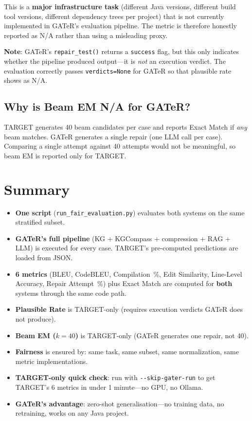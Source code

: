 \documentclass[11pt,a4paper]{article}
\begin{document}
This is a \textbf{major infrastructure task} (different Java versions,
different build tool versions, different dependency trees per project)
that is not currently implemented in GATeR's evaluation pipeline.
The metric is therefore honestly reported as N/A rather than using
a misleading proxy.

\textbf{Note}: GATeR's \texttt{repair\_test()} returns a
\texttt{success} flag, but this only indicates whether the pipeline
produced output---it is \emph{not} an execution verdict.
The evaluation correctly passes \texttt{verdicts=None} for GATeR so
that plausible rate shows as N/A.

\subsection{Why is Beam EM N/A for GATeR?}

TARGET generates 40 beam candidates per case and reports Exact Match
if \emph{any} beam matches. GATeR generates a single repair (one LLM
call per case). Comparing a single attempt against 40 attempts would
not be meaningful, so beam EM is reported only for TARGET.

\section{Summary}

\begin{itemize}
    \item \textbf{One script} (\texttt{run\_fair\_evaluation.py}) evaluates
          both systems on the same stratified subset.
    \item \textbf{GATeR's full pipeline} (KG + KGCompass + compression +
          RAG + LLM) is executed for every case.
          TARGET's pre-computed predictions are loaded from JSON.
    \item \textbf{6 metrics} (BLEU, CodeBLEU, Compilation~\%, Edit
          Similarity, Line-Level Accuracy, Repair Attempt~\%) plus
          Exact Match are computed for \textbf{both} systems through
          the same code path.
    \item \textbf{Plausible Rate} is TARGET-only (requires execution
          verdicts GATeR does not produce).
    \item \textbf{Beam EM ($k{=}40$)} is TARGET-only (GATeR generates
          one repair, not 40).
    \item \textbf{Fairness} is ensured by: same task, same subset,
          same normalization, same metric implementations.
    \item \textbf{TARGET-only quick check}: run with
          \texttt{-{}-skip-gater-run} to get TARGET's 6 metrics in
          under 1 minute---no GPU, no Ollama.
    \item \textbf{GATeR's advantage}: zero-shot generalisation---no
          training data, no retraining, works on any Java project.
\end{itemize}
\end{document}

